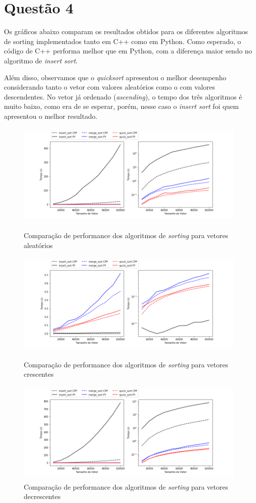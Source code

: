 \documentclass{article}
\begin{document}
\section*{Questão 4}

Os gráficos abaixo comparam os resultados obtidos para os diferentes algoritmos de sorting
implementados tanto em C++ como em Python. Como esperado, o código de C++ performa melhor
que em Python, com a diferença maior sendo no algoritmo de {\it insert sort}.

Além disso, observamos que o {\it quicksort} apresentou o melhor
desempenho considerando tanto o vetor com valores aleatórios como o com
valores descendentes.
No vetor já ordenado ({\it ascending}), o tempo dos três algoritmos é muito baixo, como
era de se esperar, porém, nesse caso o {\it insert sort} foi quem apresentou o melhor
resultado.


  \begin{figure}[!h]
  \centering
  \includegraphics[width=0.8\linewidth,height=5cm]{SortTime_Random.png}
    \caption{Comparação de performance dos algoritmos de {\it sorting} para vetores aleatórios}
    \vspace{0.5cm}
  \includegraphics[width=0.8\linewidth,height=5cm]{SortTime_Ascending.png}
    \caption{Comparação de performance dos algoritmos de {\it sorting} para vetores crescentes}
    \vspace{0.5cm}
  \includegraphics[width=0.8\linewidth,height=5cm]{SortTime_Descending.png}
    \caption{Comparação de performance dos algoritmos de {\it sorting} para vetores decrescentes}
  \end{figure}

\end{document}
